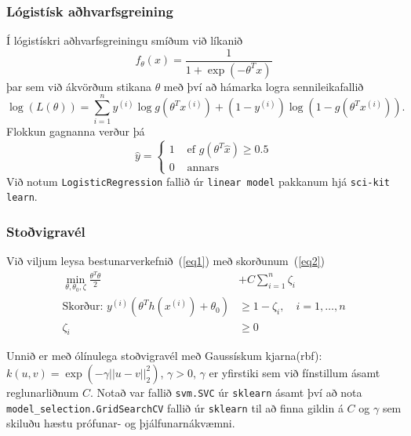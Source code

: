 \documentclass[11pt]{article}
\begin{document}
\subsubsection{Lógistísk aðhvarfsgreining}
Í lógistískri aðhvarfsgreiningu smíðum við líkanið
$$ f_{\theta}(x)=\frac{1}{1+\exp (-\theta^{T} x)} $$
þar sem við ákvörðum stikana $\theta$ með því að hámarka logra sennileikafallið
\begin{equation}
    \log(L(\theta)) = \sum _ { i = 1 } ^ { n } y ^ { ( i ) } \log g \left( \theta ^ { T } x ^ { ( i ) } \right) + \left( 1 - y ^ { ( i ) } \right) \log \left( 1 - g \left( \theta ^ { T } x ^ { ( i ) } \right)\right).
\end{equation}
Flokkun gagnanna verður þá
$$ \hat{y}=\left\{\begin{array}{ll}{1} & {\text { ef } g\left(\theta^{T} \hat{x}\right) \geq 0.5} \\ {0} & {\text { annars }}\end{array}\right. $$
Við notum {\tt LogisticRegression} fallið úr {\tt linear model} pakkanum hjá {\tt sci-kit learn}.
\subsubsection{Stoðvigravél}
Við viljum leysa bestunarverkefnið~(\ref{eq1}) með skorðunum~(\ref{eq2})
\begin{align}
    \min _ { \theta , \theta _ { 0 } , \zeta } \frac { \theta ^ { T } \theta } { 2 } &+ C \sum _ { i = 1 } ^ { n } \zeta _ { i }\label{eq1}\\
\text{Skorður: } y ^ { ( i ) } \left( \theta ^ { T } h \left( x ^ { ( i ) } \right) + \theta _ { 0 } \right) &\geq 1 - \zeta _ { i } , \quad i = 1 , \ldots , n  \label{eq2}\\
 \zeta _ { i } &\geq 0 \nonumber
\end{align}

Unnið er með ólínulega stoðvigravél með Gaussískum kjarna(rbf): $k(u,v) = \exp(-\gamma||u-v||^2_2)$, $ \gamma>0$, $\gamma$ er yfirstiki sem við fínstillum ásamt reglunarliðnum $C$.
Notað var fallið {\tt svm.SVC} úr {\tt sklearn} ásamt því að nota {\tt model\_selection.GridSearchCV} fallið úr {\tt sklearn} til að finna gildin á $C$ og $\gamma$ sem skiluðu hæstu prófunar- og þjálfunarnákvæmni.
\end{document}
